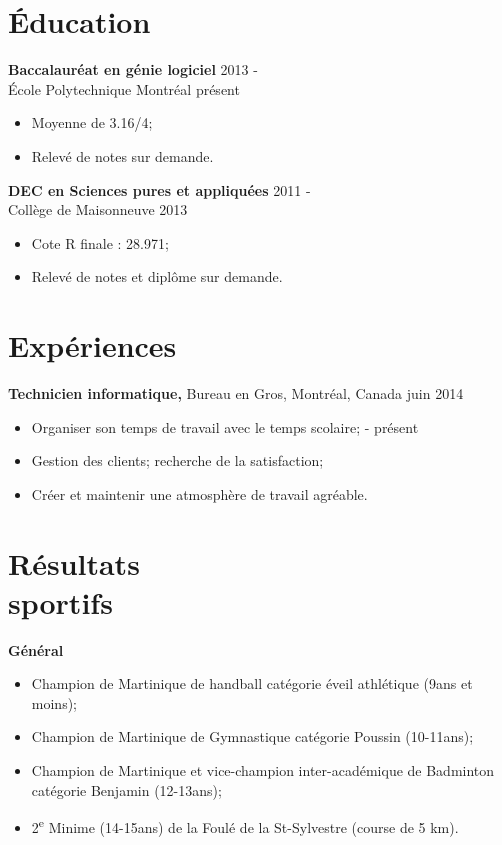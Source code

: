 \documentclass[margin]{res}
\begin{document}
\begin{resume}

  \section{\'{E}ducation}
  
  {\bf Baccalauréat en g\'{e}nie logiciel} \hfill 2013 -\\ 
  \'{E}cole Polytechnique Montr\'{e}al \hfill pr\'{e}sent
  \begin{itemize} \itemsep -2pt
  \item Moyenne de 3.16/4; 
  \item Relev\'{e} de notes sur demande.
  \end{itemize}
  
  
  {\bf DEC en Sciences pures et appliqu\'{e}es} \hfill 2011 -\\
  Coll\`{e}ge de Maisonneuve \hfill 2013
  \begin{itemize} \itemsep -2pt
  \item Cote R finale : 28.971; 
  \item Relev\'{e} de notes et dipl\^{o}me sur demande.
  \end{itemize}


  
  \section{Exp\'{e}riences}
  
  {\bf Technicien informatique,} Bureau en Gros, Montr\'{e}al, Canada \hfill juin 2014
  \begin{itemize} \itemsep -2pt  %
  \item Organiser son temps de travail avec le temps scolaire; \hfill - pr\'{e}sent
  \item Gestion des clients; recherche de la satisfaction;
  \item Cr\'{e}er et maintenir une atmosph\`{e}re de travail agr\'{e}able. 
  \end{itemize}
  

  \section{R\'esultats \\sportifs}
  
  {\bf G\'en\'eral}
  \begin{itemize} \itemsep -2pt %
  \item Champion de Martinique de handball cat\'egorie \'eveil athl\'etique (9ans et moins);
  \item Champion de Martinique de Gymnastique cat\'egorie Poussin (10-11ans);
  \item Champion de Martinique et vice-champion inter-acad\'emique de Badminton cat\'egorie Benjamin (12-13ans);
  \item 2\textsuperscript{e} Minime (14-15ans) de la Foul\'e de la St-Sylvestre (course de 5 km).
  \end{itemize}


\end{resume}
\end{document}
